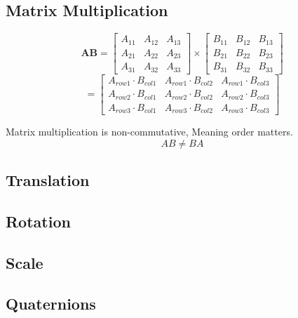 \subsection{Matrix Multiplication}

\begin{equation}
\textbf{AB} = \begin{bmatrix}
A_{11} & A_{12} & A_{13}\\
A_{21} & A_{22} & A_{23}\\
A_{31} & A_{32} & A_{33}
\end{bmatrix}
\times
\begin{bmatrix}
B_{11} & B_{12} & B_{13}\\
B_{21} & B_{22} & B_{23}\\
B_{31} & B_{32} & B_{33}
\end{bmatrix}
\end{equation}
\begin{equation}
= \begin{bmatrix}
A_{row1} \cdot B_{col1} & A_{row1} \cdot B_{col2} & A_{row1} \cdot B_{col3}\\
A_{row2} \cdot B_{col1} & A_{row2} \cdot B_{col2} & A_{row2} \cdot B_{col3}\\
A_{row3} \cdot B_{col1} & A_{row3} \cdot B_{col2} & A_{row3} \cdot B_{col3}
\end{bmatrix}
\end{equation}

\begin{flushleft}
Matrix multiplication is non-commutative, Meaning order matters.
\begin{equation}
AB \neq BA
\end{equation}
\end{flushleft}



\subsection{Translation}



\subsection{Rotation}

\subsection{Scale}


\subsection{Quaternions}

